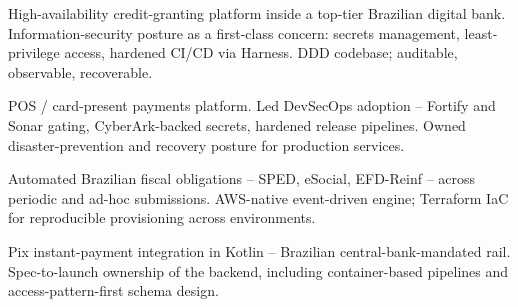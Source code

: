 \documentclass[10pt,a4paper,ragged2e]{altacv}
\begin{document}

\begin{fullwidth}\makecvheader\end{fullwidth}


High-availability credit-granting platform inside a top-tier Brazilian digital bank. Information-security posture as a first-class concern: secrets management, least-privilege access, hardened CI/CD via Harness. DDD codebase; auditable, observable, recoverable.

\divider

POS / card-present payments platform. Led DevSecOps adoption -- Fortify and Sonar gating, CyberArk-backed secrets, hardened release pipelines. Owned disaster-prevention and recovery posture for production services.

\divider

Automated Brazilian fiscal obligations -- SPED, eSocial, EFD-Reinf -- across periodic and ad-hoc submissions. AWS-native event-driven engine; Terraform IaC for reproducible provisioning across environments.

\divider

Pix instant-payment integration in Kotlin -- Brazilian central-bank-mandated rail. Spec-to-launch ownership of the backend, including container-based pipelines and access-pattern-first schema design.
\end{document}
